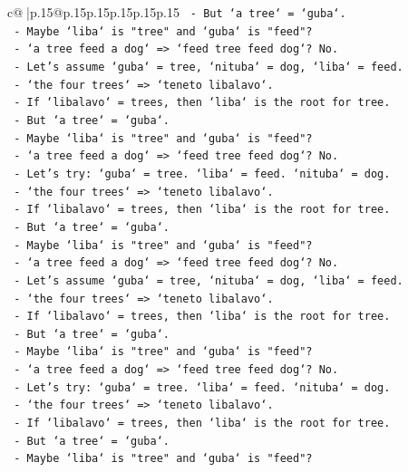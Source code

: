 \documentclass{article}
\begin{document}
{\begin{supertabular}{c@{$\;$}|p{.15\linewidth}@{}p{.15\linewidth}p{.15\linewidth}p{.15\linewidth}p{.15\linewidth}p{.15\linewidth}}
{{{\texttt{  {-} But `a tree` = `guba`.} \\
\texttt{  {-} Maybe `liba` is "tree" and `guba` is "feed"?} \\
\texttt{  {-} `a tree feed a dog` => `feed tree feed dog`? No.} \\
\texttt{  {-} Let's assume `guba` = tree, `nituba` = dog, `liba` = feed.} \\
\texttt{  {-} `the four trees` => `teneto libalavo`.} \\
\texttt{  {-} If `libalavo` = trees, then `liba` is the root for tree.} \\
\texttt{  {-} But `a tree` = `guba`.} \\
\texttt{  {-} Maybe `liba` is "tree" and `guba` is "feed"?} \\
\texttt{  {-} `a tree feed a dog` => `feed tree feed dog`? No.} \\
\texttt{  {-} Let's try: `guba` = tree. `liba` = feed. `nituba` = dog.} \\
\texttt{  {-} `the four trees` => `teneto libalavo`.} \\
\texttt{  {-} If `libalavo` = trees, then `liba` is the root for tree.} \\
\texttt{  {-} But `a tree` = `guba`.} \\
\texttt{  {-} Maybe `liba` is "tree" and `guba` is "feed"?} \\
\texttt{  {-} `a tree feed a dog` => `feed tree feed dog`? No.} \\
\texttt{  {-} Let's assume `guba` = tree, `nituba` = dog, `liba` = feed.} \\
\texttt{  {-} `the four trees` => `teneto libalavo`.} \\
\texttt{  {-} If `libalavo` = trees, then `liba` is the root for tree.} \\
\texttt{  {-} But `a tree` = `guba`.} \\
\texttt{  {-} Maybe `liba` is "tree" and `guba` is "feed"?} \\
\texttt{  {-} `a tree feed a dog` => `feed tree feed dog`? No.} \\
\texttt{  {-} Let's try: `guba` = tree. `liba` = feed. `nituba` = dog.} \\
\texttt{  {-} `the four trees` => `teneto libalavo`.} \\
\texttt{  {-} If `libalavo` = trees, then `liba` is the root for tree.} \\
\texttt{  {-} But `a tree` = `guba`.} \\
\texttt{  {-} Maybe `liba` is "tree" and `guba` is "feed"?} \\
}}}
\end{supertabular}}
\end{document}
